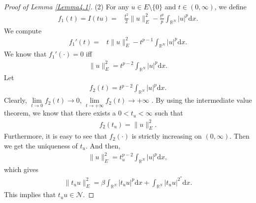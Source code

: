 \documentclass[10pt,a4paper]{amsart}
\begin{document}
\begin{proof}[Proof of Lemma \ref{Lemma4.1}]
(2)
For any $u\in E\setminus\{0\}$ and $t\in (0,\infty)$, we define
\begin{equation*}
\begin{aligned}
f_{1}(t)=I(tu)=&\frac{t^{2}}{2}\|u\|_{E}^{2}-\frac{t^{p}}{p}\int_{\mathbb{R}^{N}}|u|^{p}\mathrm{d}x.
\end{aligned}
\end{equation*}
We compute
\begin{equation*}
\begin{aligned}
f_{1}'(t)
=&t\|u\|_{E}^{2}
-t^{p-1}
\int_{\mathbb{R}^{N}}|u|^{p}\mathrm{d}x.
\end{aligned}
\end{equation*}
We know that $f_{1}'(\cdot)=0$ iff
\begin{equation*}
\begin{aligned}
\|u\|_{E}^{2}
=t^{p-2}
\int_{\mathbb{R}^{N}}|u|^{p}\mathrm{d}x.
\end{aligned}
\end{equation*}
Let
\begin{equation*}
\begin{aligned}
f_{2}(t)
=t^{p-2}
\int_{\mathbb{R}^{N}}|u|^{p}\mathrm{d}x.
\end{aligned}
\end{equation*}
Clearly, $\lim\limits_{t\rightarrow0}f_{2}(t)\rightarrow0$, $\lim\limits_{t\rightarrow+\infty}f_{2}(t)\rightarrow+\infty$ .
By using the intermediate value theorem, we know that there exists a $0<t_{u}<\infty$ such that
\begin{equation*}
\begin{aligned}
f_{2}(t_{u})=\|u\|_{E}^{2}.
\end{aligned}
\end{equation*}
Furthermore, it is easy to see that $f_{2}(\cdot)$ is strictly increasing on $(0,\infty)$.
Then we get the uniqueness of $t_{u}$.
And then,
\begin{equation*}
\begin{aligned}
\|u\|_{E}^{2}
=t_{u}^{p-2}
\int_{\mathbb{R}^{N}}|u|^{p}\mathrm{d}x,
\end{aligned}
\end{equation*}
which gives
\begin{equation*}
\begin{aligned}
\|t_{u}u\|_{E}^{2}
=\beta\int_{\mathbb{R}^{N}}|t_{u}u|^{p}\mathrm{d}x
+\int_{\mathbb{R}^{N}}|t_{u}u|^{2^{*}}\mathrm{d}x.
\end{aligned}
\end{equation*}
This implies that $t_{u}u\in \mathcal{N}$.



\end{proof}
\end{document}
